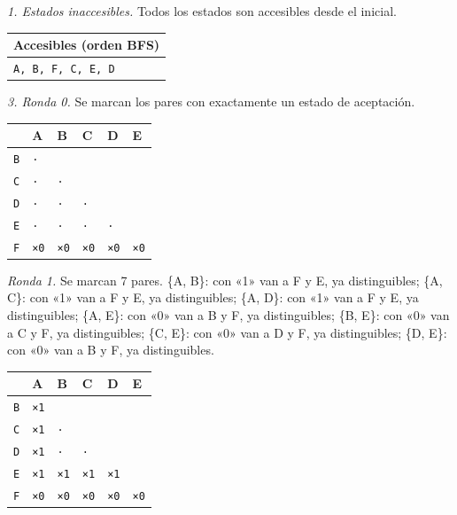 \documentclass[11pt]{article}
\begin{document}
\textit{1. Estados inaccesibles.} Todos los estados son accesibles desde el inicial.
\begin{center}\footnotesize\begin{tabular}{l}\toprule
Accesibles (orden BFS) \\\midrule
\texttt{A, B, F, C, E, D} \\
\bottomrule\end{tabular}\end{center}
\textit{3. Ronda 0.} Se marcan los pares con exactamente un estado de aceptación.
\begin{center}\footnotesize\begin{tabular}{llllll}\toprule
 & A & B & C & D & E \\\midrule
\texttt{B} & \texttt{·} & \texttt{} & \texttt{} & \texttt{} & \texttt{} \\
\texttt{C} & \texttt{·} & \texttt{·} & \texttt{} & \texttt{} & \texttt{} \\
\texttt{D} & \texttt{·} & \texttt{·} & \texttt{·} & \texttt{} & \texttt{} \\
\texttt{E} & \texttt{·} & \texttt{·} & \texttt{·} & \texttt{·} & \texttt{} \\
\texttt{F} & \texttt{×0} & \texttt{×0} & \texttt{×0} & \texttt{×0} & \texttt{×0} \\
\bottomrule\end{tabular}\end{center}
\textit{Ronda 1.} Se marcan 7 pares. \{A, B\}: con «1» van a F y E, ya distinguibles; \{A, C\}: con «1» van a F y E, ya distinguibles; \{A, D\}: con «1» van a F y E, ya distinguibles; \{A, E\}: con «0» van a B y F, ya distinguibles; \{B, E\}: con «0» van a C y F, ya distinguibles; \{C, E\}: con «0» van a D y F, ya distinguibles; \{D, E\}: con «0» van a B y F, ya distinguibles.
\begin{center}\footnotesize\begin{tabular}{llllll}\toprule
 & A & B & C & D & E \\\midrule
\texttt{B} & \texttt{×1} & \texttt{} & \texttt{} & \texttt{} & \texttt{} \\
\texttt{C} & \texttt{×1} & \texttt{·} & \texttt{} & \texttt{} & \texttt{} \\
\texttt{D} & \texttt{×1} & \texttt{·} & \texttt{·} & \texttt{} & \texttt{} \\
\texttt{E} & \texttt{×1} & \texttt{×1} & \texttt{×1} & \texttt{×1} & \texttt{} \\
\texttt{F} & \texttt{×0} & \texttt{×0} & \texttt{×0} & \texttt{×0} & \texttt{×0} \\
\bottomrule\end{tabular}\end{center}
\end{document}
